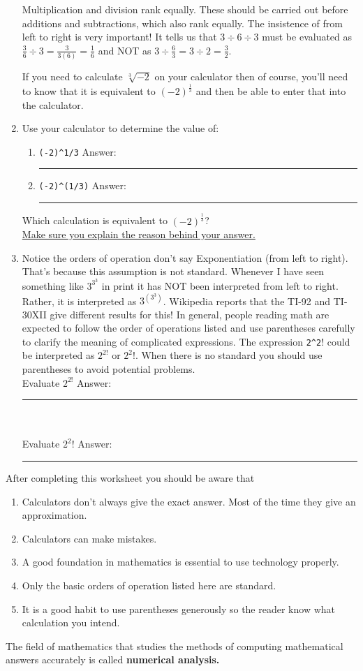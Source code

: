 \documentclass[12pt]{article}%
\begin{document}
\begin{enumerate}
Multiplication and division rank equally. These should be carried out before additions and
subtractions, which also rank equally. The insistence of from left to right is very important!
It tells us that $3 \div 6 \div 3$ must be evaluated as $\frac{3}{6}\div 3=\frac{3}{3(6)}=
\frac{1}{6}$ and NOT as $3 \div \frac{6}{3}=3\div 2= \frac{3}{2}$. 

If you need to calculate $\sqrt[3]{-2}$ on your calculator then of course, you'll need to 
know that it is equivalent to $(-2)^{\frac{1}{3}}$ and then be able to  enter that into
the calculator.

\item Use your calculator to determine the value of:
\begin{enumerate}
\item \verb!(-2)^1/3!  \hspace{40 mm}Answer: \rule{50 mm}{.2pt}
\item \verb!(-2)^(1/3)! \hspace{36 mm}Answer: \rule{50 mm}{.2pt}
\end{enumerate}
Which calculation is equivalent to $(-2)^{\frac{1}{3}}$?\\

\underline{Make sure you explain the reason behind your answer.}
\item Notice the orders of operation don't say Exponentiation (from left to right). That's
because this assumption is not standard. Whenever I have seen something like $3^{3^3}$ in
print it has NOT been interpreted from left to right. Rather, it is interpreted 
as $3^{(3^3)}$. Wikipedia reports that the TI-92 and TI-30XII give different results for this!
In general, people reading math are expected to follow the order 
of operations listed and use parentheses carefully
to clarify the meaning of complicated expressions. The expression \verb!2^2!! could be
interpreted as $2^{2!}$ or $2^{2}!$. When there is no standard you
should use parentheses to avoid potential problems.\\

Evaluate $2^{2!}$ \hspace{40 mm}Answer: \rule{50 mm}{.2pt}\\\\
Evaluate $2^{2}!$ \hspace{40 mm}Answer: \rule{50 mm}{.2pt}
\end{enumerate}

After completing this worksheet you should be aware that 
\begin{enumerate}
\item Calculators don't always give the exact answer. Most of the time they give an
approximation.
\item Calculators can make mistakes.
\item A good foundation in mathematics is essential to use technology properly.
\item Only the basic orders of operation listed here are standard. 
\item It is a good habit to use parentheses generously so the reader know what calculation
you intend.
\end{enumerate}

The field of mathematics that studies the methods of computing mathematical answers
accurately is called \textbf{numerical analysis.}
\end{document}
